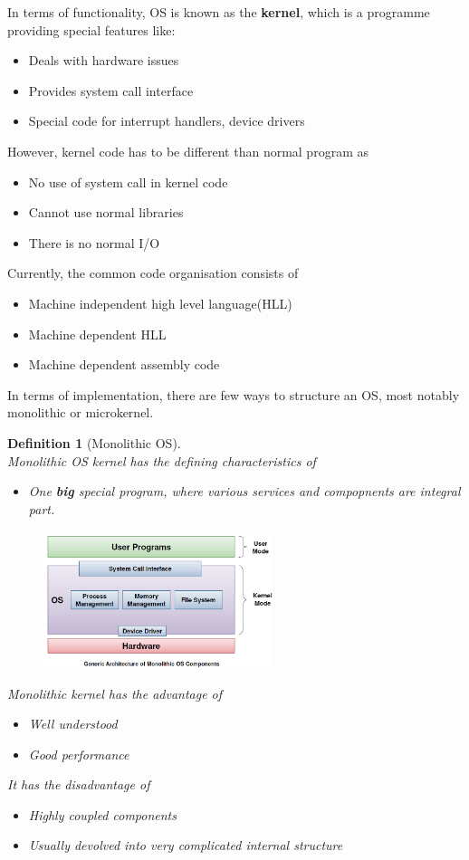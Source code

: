 \documentclass[12pt]{article}
\newtheorem{definition}{Definition}[section]
\theoremstyle{definition}
\begin{document}
In terms of functionality, OS is known as the \textbf{kernel}, which is a programme providing special features like:
\begin{itemize}
  \item Deals with hardware issues
  \item Provides system call interface
  \item Special code for interrupt handlers, device drivers
\end{itemize}
However, kernel code has to be different than normal program as
\begin{itemize}
  \item No use of system call in kernel code
  \item Cannot use normal libraries
  \item There is no normal I/O
\end{itemize}
Currently, the common code organisation consists of
\begin{itemize}
  \item Machine independent high level language(HLL)
  \item Machine dependent HLL
  \item Machine dependent assembly code
\end{itemize}
In terms of implementation, there are few ways to structure an OS, most notably monolithic or microkernel.
\begin{definition}[Monolithic OS]
\hfill\\\normalfont Monolithic OS kernel has the defining characteristics of
\begin{itemize}
  \item One \textbf{big} special program, where various services and compopnents are integral part.
\end{itemize}
\begin{figure}[h]
\centering
\includegraphics[width = 0.6\textwidth]{1_6.png}
\end{figure}
Monolithic kernel has the advantage of
\begin{itemize}
  \item Well understood
  \item Good performance
\end{itemize}
It has the disadvantage of
\begin{itemize}
  \item Highly coupled components
  \item Usually devolved into very complicated internal structure
\end{itemize}
\end{definition}
\end{document}
